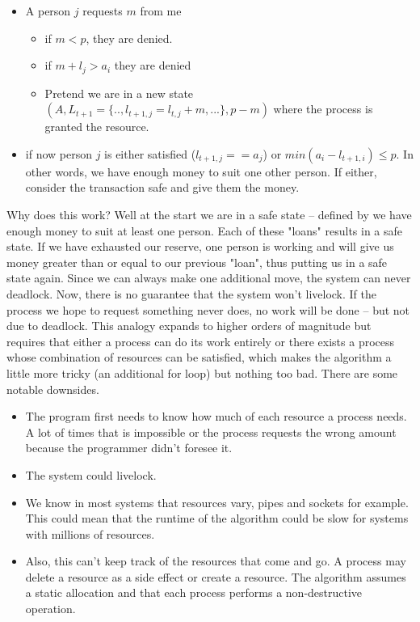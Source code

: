 \begin{itemize}
\item A person $j$ requests $m$ from me
\begin{itemize}
\item if $m < p$, they are denied.
\item if $m + l_j > a_i$ they are denied
\item Pretend we are in a new state $(A, L_{t+1}=\{.., l_{t+1, j} = l_{t, j} + m, ...\}, p - m)$ where the process is granted the resource.
\end{itemize}
\item if now person $j$ is either satisfied ($l_{t+1,j} == a_j$) or $min(a_i - l_{t+1, i}) \leq p$. In other words, we have enough money to suit one other person. If either, consider the transaction safe and give them the money.
\end{itemize}

Why does this work? Well at the start we are in a safe state -- defined by we have enough money to suit at least one person.
Each of these "loans" results in a safe state.
If we have exhausted our reserve, one person is working and will give us money greater than or equal to our previous "loan", thus putting us in a safe state again.
Since we can always make one additional move, the system can never deadlock.
Now, there is no guarantee that the system won't livelock.
If the process we hope to request something never does, no work will be done -- but not due to deadlock.
This analogy expands to higher orders of magnitude but requires that either a process can do its work entirely or there exists a process whose combination of resources can be satisfied, which makes the algorithm a little more tricky (an additional for loop) but nothing too bad.
There are some notable downsides.

\begin{itemize}
\item The program first needs to know how much of each resource a process needs. A lot of times that is impossible or the process requests the wrong amount because the programmer didn't foresee it.
\item The system could livelock.
\item We know in most systems that resources vary, pipes and sockets for example. This could mean that the runtime of the algorithm could be slow for systems with millions of resources.
\item Also, this can't keep track of the resources that come and go. A process may delete a resource as a side effect or create a resource. The algorithm assumes a static allocation and that each process performs a non-destructive operation.
\end{itemize}

